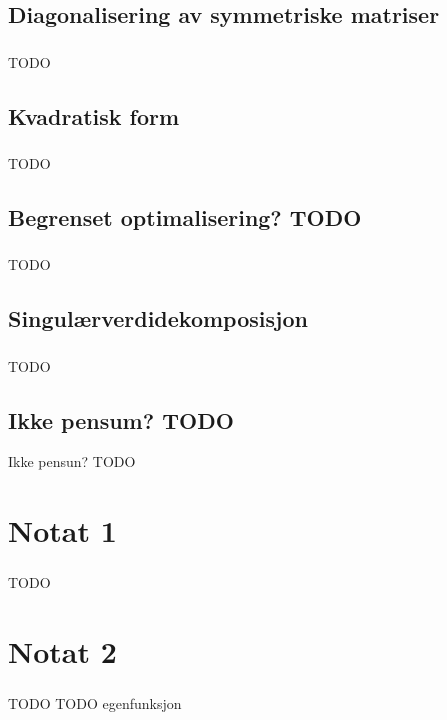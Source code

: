 \documentclass{article}
\begin{document}
    \subsection{Diagonalisering av symmetriske matriser}
      \subsubsection{}
        TODO
    \subsection{Kvadratisk form}
      \subsubsection{}
        TODO
    \subsection{Begrenset optimalisering? TODO}
      \subsubsection{}
        TODO
    \subsection{Singulærverdidekomposisjon}
      \subsubsection{}
        TODO
    \subsection{Ikke pensum? TODO}
      Ikke pensun? TODO
  \section{Notat 1}
    \subsubsection{}
      TODO
  \section{Notat 2}
    \subsubsection{}
      TODO
  TODO egenfunksjon
\end{document}
